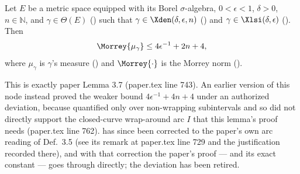 \begin{lemma}
  \label{full-ball-lem}
  Let $E$ be a metric space equipped with its Borel $\sigma$-algebra, $0 < \epsilon < 1$, $\delta >
  0$, $n \in \mathbb{N}$, and $\gamma \in \Theta(E)$ () such that
  $\gamma \in \Xden(\delta,\epsilon,n)$ () and $\gamma \in
  \Xlsi(\delta,\epsilon)$ (). Then
  \[
    \Morrey{\mu_\gamma} \leq 4\epsilon^{-1} + 2n + 4
    ,
  \]
  where $\mu_\gamma$ is $\gamma$'s measure () and $\Morrey{\cdot}$ is the
  Morrey norm ().

  This is exactly paper Lemma 3.7 (paper.tex line 743). An earlier version of this node instead
  proved the weaker bound $4\epsilon^{-1}+4n+4$ under an authorized deviation, because
   quantified only over non-wrapping subintervals and so did not directly
  support the closed-curve wrap-around arc $I$ that this lemma's proof needs (paper.tex line 762).
   has since been corrected to the paper's own arc reading of Def.~3.5 (see
  its remark at paper.tex line 729 and the justification recorded there), and with that correction
  the paper's proof — and its exact constant — goes through directly; the deviation has been
  retired.
\end{lemma}
